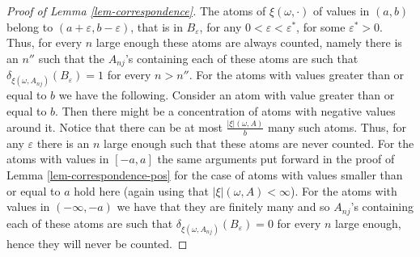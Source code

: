 \documentclass{article}
\theoremstyle{plain}
\theoremstyle{remark}
\begin{document}
\begin{proof}[Proof of Lemma \ref{lem-correspondence}]
	The atoms of $\xi(\omega,\cdot)$ of values in $(a,b)$ belong to $(a+\varepsilon,b-\varepsilon)$, that is in $B_\varepsilon$, for any $0<\varepsilon<\varepsilon^*$, for some $\varepsilon^*>0$. Thus, for every $n$ large enough these atoms are always counted, namely there is an $n''$ such that the $A_{nj}$'s containing each of these atoms are such that $\delta_{\xi(\omega,A_{nj})}(B_{\varepsilon})=1$ for every $n>n''$. For the atoms with values greater than or equal to $b$ we have the following. Consider an atom with value greater than or equal to $b$. Then there might be a concentration of atoms with negative values around it. Notice that there can be at most $\frac{|\xi|(\omega,A)}{b}$ many such atoms. Thus, for any $\varepsilon$ there is an $n$ large enough such that these atoms are never counted. For the atoms with values in $[-a,a]$ the same arguments put forward in the proof of Lemma \ref{lem-correspondence-pos} for the case of atoms with values smaller than or equal to $a$ hold here (again using that $|\xi|(\omega,A)<\infty$). For the atoms with values in $(-\infty,-a)$ we have that they are finitely many and so $A_{nj}$'s containing each of these atoms are such that $\delta_{\xi(\omega,A_{nj})}(B_{\varepsilon})=0$ for every $n$ large enough, hence they will never be counted. 
	

\end{proof}
\end{document}
